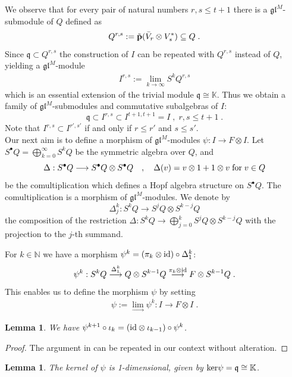 \documentclass[12pt]{article}
\def\KK {{\mathbb K}}     %
\def\NN {{\mathbb N}}     %
\def\lw  {\longrightarrow}
\def\mk {\mathfrak}
\newtheorem{lemma}[theorem]{Lemma}
\begin{document}
We observe that for every pair of natural numbers $r,s\leq t+1$ there is a $\mk{gl}^M$-submodule of $Q$ defined as
$$
Q^{r,s}:=\tilde{\bf p}(\bar V_{r}\otimes V^*_{s}) \subseteq Q \;.
$$
Since $\mk q\subset Q^{r,s}$ the construction of $I$ can be repeated with $Q^{r,s}$ instead of $Q$, yielding a $\mk{gl}^M$-module
\begin{gather}\label{For Irs}
I^{r,s}:= \lim\limits_{k\to\infty} S^kQ^{r,s}
\end{gather}
which is an essential extension of the trivial module $\mk q\cong\KK$. Thus we obtain a family of $\mk{gl}^M$-submodules and commutative subalgebras of $I$:
$$
\mk q\subset I^{r,s} \subset I^{t+1,t+1}=I \;, \; r,s\leq t+1\;.
$$
Note that $I^{r,s}\subset I^{r',s'}$ if and only if $r\leq r'$ and $s\leq s'$.\\


Our next aim is to define a morphism of $\mk{gl}^M$-modules $\psi:I\to F\otimes I$. Let $S^\bullet Q=\bigoplus\limits_{k=0}^\infty S^kQ$ be the symmetric algebra over $Q$, and
$$
\Delta:S^\bullet Q \lw S^\bullet Q\otimes S^\bullet Q \quad,\quad \Delta(v)=v\otimes 1 + 1\otimes v \;{\rm for}\; v\in Q
$$
be the comultiplication which defines a Hopf algebra structure on $S^\bullet Q$. The comultiplication is a morphism of $\mk{gl}^M$-modules. We denote by
$$
\Delta^k_j:S^k Q \to S^j Q \otimes S^{k-j} Q
$$
the composition of the restriction $\Delta:S^k Q \to \bigoplus\limits_{j=0}^k S^j Q \otimes S^{k-j} Q$ with the projection to the $j$-th summand.

For $k\in\NN$ we have a morphism $\psi^k=(\pi_k\otimes{\rm id})\circ\Delta^k_1$:
$$
\psi^k:S^kQ \stackrel{\Delta^k_1}\lw Q \otimes S^{k-1} Q \stackrel{\pi_k\otimes{\rm id}}{\lw} F\otimes S^{k-1} Q \;.
$$
This enables us to define the morphism $\psi$ by setting
\begin{gather}\label{For psi morphism}
\psi := \lim\limits_{\lw} \psi^k : I \lw F\otimes I \;.
\end{gather}

\begin{lemma}
We have $\psi^{k+1}\circ \iota_k = ({\rm id}\otimes \iota_{k-1}) \circ \psi^k$.
\end{lemma}

\begin{proof}
The argument in \cite[\S~3.1]{Chirvasitu-Penkov-UTC} can be repeated in our context without alteration.
\end{proof}

\begin{lemma}
The kernel of $\psi$ is 1-dimensional, given by ${\rm ker}\psi=\mk q\cong \KK$.
\end{lemma}
\end{document}
